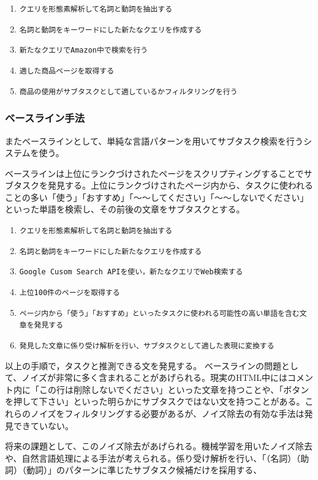 \documentclass[submit,techreq]{ipsj}
\def\|{\verb|}
\begin{document}
\begin{enumerate}
\item \|クエリを形態素解析して名詞と動詞を抽出する|
\item \|名詞と動詞をキーワードにした新たなクエリを作成する|
\item \|新たなクエリでAmazon中で検索を行う|
\item \|適した商品ページを取得する|
\item \|商品の使用がサブタスクとして適しているかフィルタリングを行う|
\end{enumerate}



\subsubsection{ベースライン手法}

またベースラインとして、単純な言語パターンを用いてサブタスク検索を行うシステムを使う。

ベースラインは上位にランクづけされたページをスクリプティングすることでサブタスクを発見する。上位にランクづけされたページ内から、タスクに使われることの多い「使う」「おすすめ」「〜〜してください」「〜〜しないでください」といった単語を検索し、その前後の文章をサブタスクとする。

\begin{enumerate}
\item \|クエリを形態素解析して名詞と動詞を抽出する|
\item \|名詞と動詞をキーワードにした新たなクエリを作成する|
\item \|Google Cusom Search APIを使い，新たなクエリでWeb検索する|
\item \|上位100件のページを取得する|
\item \|ページ内から「使う」「おすすめ」といったタスクに使われる可能性の高い単語を含む文章を発見する|
\item \|発見した文章に係り受け解析を行い、サブタスクとして適した表現に変換する|

\end{enumerate}

以上の手順で，タスクと推測できる文を発見する。
ベースラインの問題として、ノイズが非常に多く含まれることがあげられる。現実のHTML中にはコメント内に「この行は削除しないでください」といった文章を持つことや、「ボタンを押して下さい」といった明らかにサブタスクではない文を持つことがある。これらのノイズをフィルタリングする必要があるが、ノイズ除去の有効な手法は発見できていない。

将来の課題として、このノイズ除去があげられる。機械学習を用いたノイズ除去や、自然言語処理による手法が考えられる。係り受け解析を行い、「（名詞）（助詞）（動詞）」のパターンに準じたサブタスク候補だけを採用する、
\end{document}
